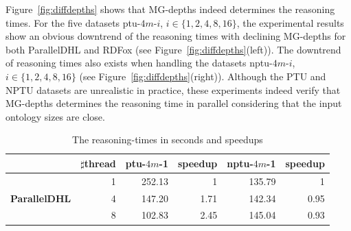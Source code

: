 Figure~\ref{fig:diffdepths} shows that MG-depths indeed determines
the reasoning times.
For the five datasets ptu-$4m$-$i$, $i\in\{1,2,4,8,16\}$, the experimental
results show an obvious downtrend of the reasoning times with declining MG-depths for
both ParallelDHL and RDFox (see Figure~\ref{fig:diffdepths}(left)).
The downtrend of reasoning times also exists
when handling the datasets nptu-$4m$-$i$, $i\in\{1,2,4,8,16\}$ (see Figure~\ref{fig:diffdepths}(right)).
Although the PTU and NPTU datasets are unrealistic in practice, these experiments indeed
verify that MG-depths determines the reasoning time in parallel
considering that the input ontology sizes are close.

\begin{table}
\centering
\caption{The reasoning-times in seconds and speedups}
\begin{tabular}{|l|r|r|r|r|r|}
\hline
&\small$\sharp$thread&ptu-$4m$-1&speedup&nptu-$4m$-1&speedup\\
\hline
\multirow{5}{*}{ \small{\textbf{ParallelDHL}}}&1&252.13&1&135.79&1\\
                                &4&147.20&1.71&142.34&0.95\\
                                &8&102.83&2.45&145.04&0.93\\

\end{tabular}
\end{table}
